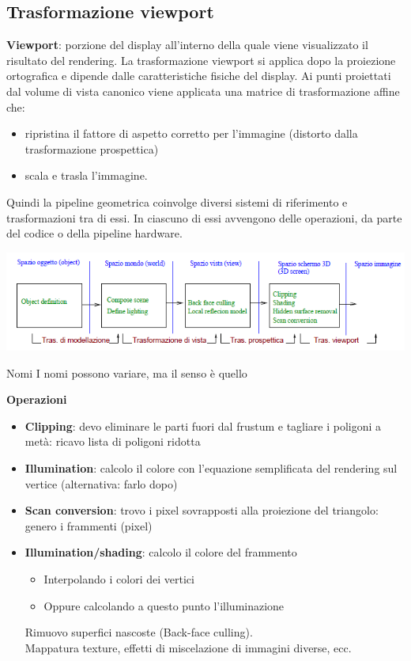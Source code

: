 \documentclass[a4paper, 10pt]{article}
\begin{document}
	\subsection{Trasformazione viewport}
		\textbf{Viewport}: porzione del display all’interno della quale viene visualizzato il risultato del rendering. La trasformazione viewport si applica dopo la proiezione
		ortografica e dipende dalle caratteristiche fisiche del display. Ai punti proiettati dal volume di vista canonico viene applicata una matrice di trasformazione affine che: 
		\begin{itemize}
			\item ripristina il fattore di aspetto corretto per l’immagine (distorto dalla trasformazione prospettica)
			\item scala e trasla l’immagine.
		\end{itemize}
	
		Quindi la pipeline geometrica coinvolge diversi sistemi di riferimento e trasformazioni tra di essi. In ciascuno di essi avvengono delle operazioni, da parte del codice o della pipeline hardware.
		
		\begin{center}
			\includegraphics[scale=0.5]{pipelineg6}
		\end{center}
		
		Nomi
		I nomi possono variare, ma il senso è quello
	
	
		\textbf{Operazioni}
		\begin{itemize}
			\item \textbf{Clipping}: devo eliminare le parti fuori dal frustum e tagliare i
			poligoni a metà: ricavo lista di poligoni ridotta
			\item \textbf{Illumination}: calcolo il colore con l'equazione semplificata del
			rendering sul vertice (alternativa: farlo dopo)
			\item \textbf{Scan conversion}: trovo i pixel sovrapposti alla proiezione del
			triangolo: genero i frammenti (pixel)
			\item \textbf{Illumination/shading}: calcolo il colore del frammento
			\begin{itemize}
				\item Interpolando i colori dei vertici
				\item Oppure calcolando a questo punto l'illuminazione
			\end{itemize}
			Rimuovo superfici nascoste (Back-face culling).\\
			Mappatura texture, effetti di miscelazione di immagini diverse,
			ecc.
		\end{itemize}
\end{document}
